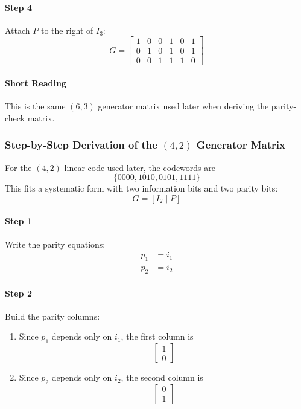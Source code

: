 \documentclass[11pt,a4paper]{book}
\begin{document}
\paragraph{Step 4}
Attach \(P\) to the right of \(I_3\):
\[
G=
\left[
\begin{array}{ccc|ccc}
1&0&0&1&0&1\\
0&1&0&1&0&1\\
0&0&1&1&1&0
\end{array}
\right]
\]

\paragraph{Short Reading}
This is the same \((6,3)\) generator matrix used later when deriving the parity-check matrix.

\subsubsection{Step-by-Step Derivation of the \((4,2)\) Generator Matrix}

For the \((4,2)\) linear code used later, the codewords are
\[
\{0000,1010,0101,1111\}
\]
This fits a systematic form with two information bits and two parity bits:
\[
G=[I_2\mid P]
\]

\paragraph{Step 1}
Write the parity equations:
\begin{align*}
p_1 &= i_1\\
p_2 &= i_2
\end{align*}

\paragraph{Step 2}
Build the parity columns:
\begin{enumerate}
    \item Since \(p_1\) depends only on \(i_1\), the first column is
    \[
    \begin{bmatrix}
    1\\0
    \end{bmatrix}
    \]
    \item Since \(p_2\) depends only on \(i_2\), the second column is
    \[
    \begin{bmatrix}
    0\\1
    \end{bmatrix}
    \]
\end{enumerate}
\end{document}
